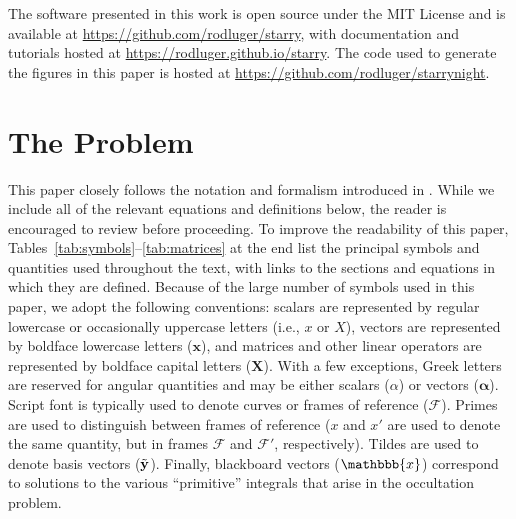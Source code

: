 \documentclass[modern]{aastex62}
\begin{document}
\vspace{1em}

The software presented in this work is open source under the MIT License and
is available at \url{https://github.com/rodluger/starry}, with documentation
and tutorials hosted at \url{https://rodluger.github.io/starry}.
The code used to generate the figures in this paper is hosted
at \url{https://github.com/rodluger/starrynight}.





\appendix

%

\section{The Problem}
\label{sec:the-problem}
%
This paper closely follows the
notation and formalism introduced in \citet{Luger2019}. While we
include all of the relevant equations and definitions below,
the reader is encouraged to
review \citet{Luger2019} before proceeding.
To improve the readability of this paper,
Tables~\ref{tab:symbols}--\ref{tab:matrices} at the end list the principal
symbols and quantities used throughout the text, with links to the
sections and equations in which they are defined.
Because of the large number of symbols used in this paper, we adopt
the following conventions: scalars are represented by regular lowercase or
occasionally uppercase letters (i.e., $x$ or $X$), vectors are
represented by boldface lowercase letters
($\mathbf{x}$), and matrices and other linear operators are represented
by boldface capital letters ($\mathbf{X}$).
With a few exceptions,
Greek letters are reserved for angular quantities and may be either
scalars ($\alpha$) or vectors ($\pmb{\alpha}$).
Script font is typically used to denote curves or frames of reference
($\mathcal{F}$). Primes are used to
distinguish between frames of reference ($x$ and $x'$ are used
to denote the same quantity, but in frames $\mathcal{F}$ and $\mathcal{F}'$,
respectively). Tildes are used to denote basis vectors ($\tilde{\mathbf{y}}$). Finally,
blackboard vectors ($\mathbbb{x}$) correspond to solutions
to the various ``primitive'' integrals that arise in the occultation
problem.
\end{document}
